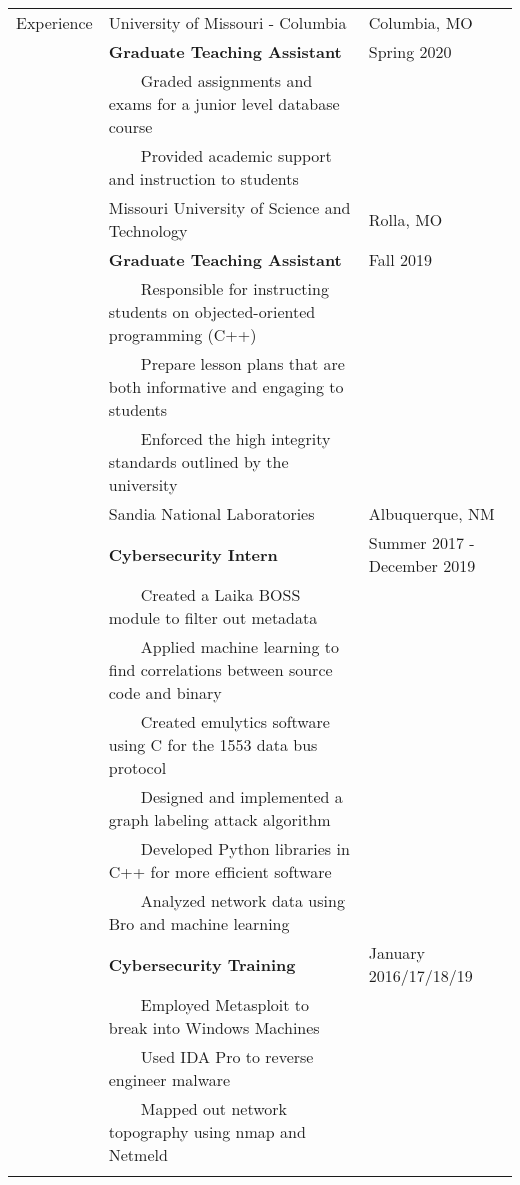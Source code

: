 \documentclass[10.5pt, arial]{article}
\newcommand{\tabitem}{~~\llap{\textbullet}~~}
\begin{document}
\begin{tabular}{p{1.5cm} p{13.2cm} l}
Experience  
            & University of Missouri - Columbia                                 & Columbia, MO          \\
            & \textbf{Graduate Teaching Assistant}                              & Spring 2020           \\
            & \tabitem Graded assignments and exams for a junior level database course                  \\
            & \tabitem Provided academic support and instruction to students                            \\

            & Missouri University of Science and Technology                     & Rolla, MO             \\
            & \textbf{Graduate Teaching Assistant}                              & Fall 2019             \\
            & \tabitem Responsible for instructing students on objected-oriented programming (C++)  &   \\
            & \tabitem Prepare lesson plans that are both informative and engaging to students      &   \\
            & \tabitem Enforced the high integrity standards outlined by the university             &   \\ 
            
            
            & Sandia National Laboratories	& Albuquerque, NM 		\\
			& \textbf{Cybersecurity Intern}										& Summer 2017 - December 2019 		\\
			& \tabitem Created a Laika BOSS module to filter out metadata		&						\\
			& \tabitem Applied machine learning to find correlations between source code and binary & 	\\
			& \tabitem Created emulytics software using C for the 1553 data bus protocol 	&			\\
            & \tabitem Designed and implemented a graph labeling attack algorithm 	&     				\\
            & \tabitem Developed Python libraries in C++ for more efficient software 	& 				\\
            & \tabitem Analyzed network data using Bro and machine learning 			& 				\\
            & \textbf{Cybersecurity Training} 									& January 2016/17/18/19 			\\
			& \tabitem Employed Metasploit to break into Windows Machines		&	 					\\
			& \tabitem Used IDA Pro to reverse engineer malware 				& 						\\
			& \tabitem Mapped out network topography using nmap and Netmeld		&						\\ \\


\end{tabular}
\end{document}
